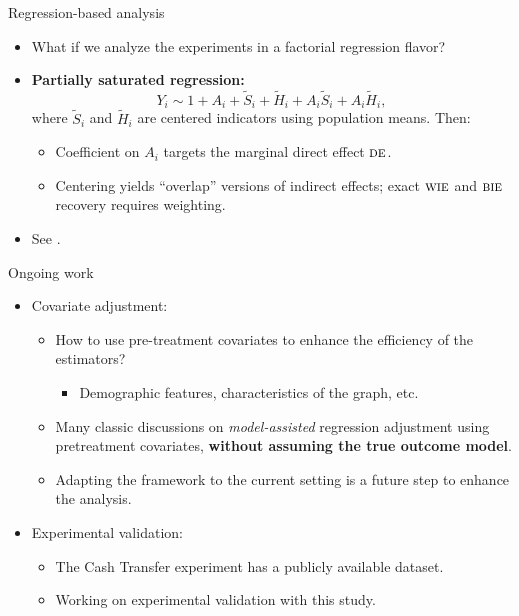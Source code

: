 \documentclass[aspectratio=169]{beamer}
\newcommand{\de}{\textsc{de}}
\newcommand{\bie}{\textsc{bie}}
\newcommand{\wie}{\textsc{wie}}
\begin{document}
\begin{frame}{Regression-based analysis}
\begin{itemize}
    \item What if we analyze the experiments in a factorial regression flavor? 
    \pause 
    \item \textbf{Partially saturated regression:}
  \[
    Y_i \sim 1 + A_i + \tilde S_i + \tilde H_i + A_i\tilde S_i + A_i \tilde H_i,
  \]
  where \(\tilde S_i\) and \(\tilde H_i\) are centered indicators using population means. Then:
  \begin{itemize}
  \pause 
    \item Coefficient on \(A_i\) targets the marginal direct effect $\de$.
  \pause 
    \item Centering yields ``overlap'' versions of indirect effects; exact $\wie$ and $\bie$ recovery requires weighting.
  \end{itemize}
  \pause 
  \item See \citet{basse2018analyzing, zhao2022regression}.
\end{itemize}
  
\end{frame}

\begin{frame}{Ongoing work}
\begin{itemize}
    \item Covariate adjustment: 
    \begin{itemize}
        \item How to use pre-treatment covariates to enhance the efficiency of the estimators?
        \begin{itemize}
            \item Demographic features, characteristics of the graph, etc.
        \end{itemize}
    \pause 
        \item Many classic discussions on \textit{model-assisted} regression adjustment using pretreatment covariates, \textbf{without assuming the true outcome model}.
    \pause 
        \item Adapting the framework to the current setting is a future step to enhance the analysis.

    \end{itemize}
    \pause 

    \item Experimental validation:
    \begin{itemize}
        \item The Cash Transfer experiment has a publicly available dataset.
        \item Working on experimental validation with this study.
    \end{itemize}
\end{itemize}
    
\end{frame}
\end{document}
